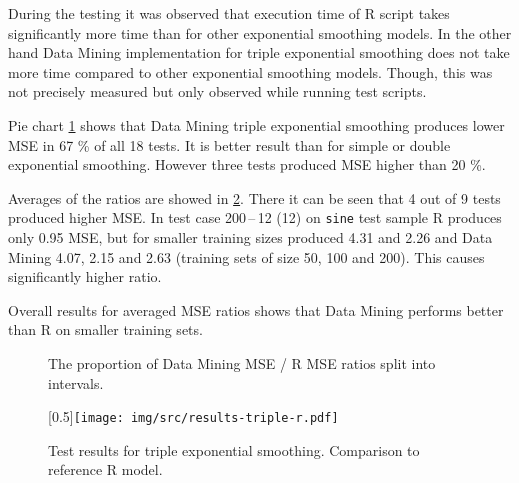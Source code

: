         During the testing it was observed that execution time of R script takes significantly more time than for other
        exponential smoothing models. In the other hand Data Mining implementation for triple exponential smoothing
        does not take more time compared to other exponential smoothing models. Though, this was not precisely measured
        but only observed while running test scripts.

        Pie chart \ref{img:results-triple-pie} shows that Data Mining triple exponential smoothing produces lower MSE
        in 67 \% of all 18 tests. It is better result than for simple or double exponential smoothing. However
        three tests produced MSE higher than 20 \%.

        Averages of the ratios are showed in \ref{img:results-triple-r}. There it can be seen that 4 out of 9 tests
        produced higher MSE. In test case 200\,--\,12 (12) on \texttt{sine} test sample R produces only 0.95 MSE, but
        for smaller training sizes produced 4.31 and 2.26 and Data Mining 4.07, 2.15 and 2.63 (training sets of size
        50, 100 and 200). This causes significantly higher ratio.

        Overall results for averaged MSE ratios shows that Data Mining performs better than R on smaller training sets.

        \begin{figure}[H]
            \begin{center}
                \caption{The proportion of Data Mining MSE / R MSE ratios split into intervals.}
                \label{img:results-triple-pie}
            \end{center}
        \end{figure}

        \begin{figure}[H]
            \begin{center}
                \scalebox{0.65}[0.5]{\texttt{[image: img/src/results-triple-r.pdf]}}
                \caption{Test results for triple exponential smoothing. Comparison to reference R model.}
                \label{img:results-triple-r}
            \end{center}
        \end{figure}

